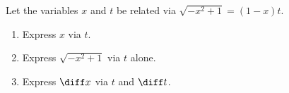 Let the variables $x$ and $t$ be related via $\sqrt{-x^2+1}= ( 1-x)t$.
\begin{enumerate}[ref={\fcProblemRef}]
\item \label{problemEulerSub-case1-cos(2arctant)-alternative-exposition-x-via-t} Express $x$ via $t$.
\item \label{problemEulerSub-case1-cos(2arctant)-alternative-exposition-radical-via-t} Express $\sqrt{-x^2+1}$ via $t$ alone.
\item Express $\diff x$ via $t$ and $\diff t$.
\end{enumerate}
